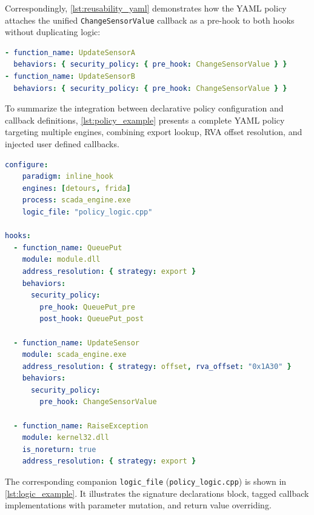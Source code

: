 Correspondingly, \cref{lst:reusability_yaml} demonstrates how the YAML policy attaches the unified \texttt{ChangeSensorValue} callback as a pre-hook to both hooks without duplicating logic:

\begin{lstlisting}[language=yaml, caption={YAML policy snippet attaching a shared callback across multiple hooks.}, label={lst:reusability_yaml}, basicstyle=\ttfamily\footnotesize, breaklines=true]
- function_name: UpdateSensorA
  behaviors: { security_policy: { pre_hook: ChangeSensorValue } }
- function_name: UpdateSensorB
  behaviors: { security_policy: { pre_hook: ChangeSensorValue } }
\end{lstlisting}



To summarize the integration between declarative policy configuration and callback definitions, \cref{lst:policy_example} presents a complete YAML policy targeting multiple engines, combining export lookup, \ac{RVA} offset resolution, and injected user defined callbacks.

\begin{lstlisting}[language=yaml, caption={Example of core HookDesigner YAML policy}, label={lst:policy_example}, basicstyle=\ttfamily\footnotesize, breaklines=true]
configure:
	paradigm: inline_hook
	engines: [detours, frida]
	process: scada_engine.exe
	logic_file: "policy_logic.cpp"

hooks:
  - function_name: QueuePut
    module: module.dll
    address_resolution: { strategy: export }
    behaviors:
      security_policy:
        pre_hook: QueuePut_pre
        post_hook: QueuePut_post

  - function_name: UpdateSensor
    module: scada_engine.exe
    address_resolution: { strategy: offset, rva_offset: "0x1A30" }
    behaviors:
      security_policy:
        pre_hook: ChangeSensorValue

  - function_name: RaiseException
    module: kernel32.dll
    is_noreturn: true
    address_resolution: { strategy: export }
\end{lstlisting}

The corresponding companion \texttt{logic\_file} (\texttt{policy\_logic.cpp}) is shown in \cref{lst:logic_example}. It illustrates the signature declarations block, tagged callback implementations with parameter mutation, and return value overriding.

